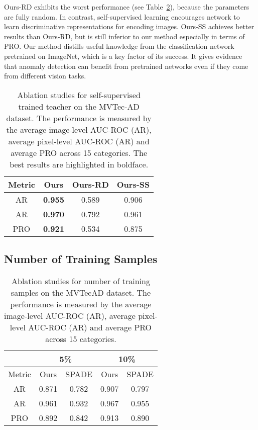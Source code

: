 \documentclass[final]{cvpr}
\begin{document}
{Ours-RD exhibits the worst performance (see Table~\ref{tab9}), because the parameters are fully random. In contrast, self-supervised learning encourages network to learn discriminative representations for encoding images. Ours-SS achieves better results than Ours-RD, but is still inferior to our method especially in terms of PRO. Our method distills useful knowledge from the classification network pretrained on ImageNet, which is a key factor of its success. It gives evidence that anomaly detection can benefit from pretrained networks even if they come from different vision tasks.

\begin{table}[!]
	\centering
	\caption{Ablation studies for self-supervised trained teacher on the MVTec-AD dataset. The performance is measured by the average image-level AUC-ROC (AR), average pixel-level AUC-ROC (AR) and average PRO across 15 categories. The best results are highlighted in boldface. }
	\label{tab9}
	\vspace{0.5em}
	\begin{adjustbox}{width=0.32\textwidth}
		\begin{tabular}{c|ccc}
			\hline
			Metric & Ours & Ours-RD & Ours-SS \\
			\hline
			AR & \textbf{0.955} & 0.589 & 0.906 \\
			AR & \textbf{0.970} & 0.792 & 0.961 \\
			PRO & \textbf{0.921} & 0.534  & 0.875 \\
			\hline
		\end{tabular}
	\end{adjustbox}
\end{table}
\fi

\subsection{Number of Training Samples}
\label{sec5:sub4}


\begin{table}[!]
	\centering
	\caption{Ablation studies for number of training samples on the MVTecAD dataset. The performance is measured by the average image-level AUC-ROC (AR), average pixel-level AUC-ROC (AR) and average PRO across 15 categories.}
	\label{tab9}
	\vspace{0.5em}
	\begin{adjustbox}{width=0.35\textwidth}
		\begin{tabular}{c|cc|cc}
			\hline
			& \multicolumn{2}{c|}{5\%} & \multicolumn{2}{c}{10\%} \\
			\hline
			Metric & Ours & SPADE & Ours & SPADE \\
			\hline
			AR & 0.871 & 0.782 & 0.907 & 0.797 \\
			AR & 0.961 & 0.932 & 0.967 & 0.955 \\
			PRO & 0.892 & 0.842 & 0.913 & 0.890 \\
			\hline
		\end{tabular}
	\end{adjustbox}
\end{table}



}
\end{document}
